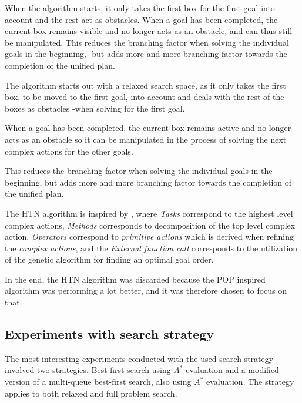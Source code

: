 \documentclass[Main]{subfiles}
\begin{document}
When the algorithm starts, it only takes the first box for the first goal into
account and the rest act as obstacles. When a goal has been completed, the
current box remains visible and no longer acts as an obstacle, and can thus
still be manipulated. This reduces the branching factor when solving the
individual goals in the beginning, -but adds more and more branching factor
towards the completion of the unified plan.

The algorithm starts out with a relaxed search space, as it only takes the first
box, to be moved to the first goal, into account and deals with the rest of the
boxes as obstacles -when solving for the first goal.

When a goal has been completed, the current box remains active and no longer
acts as an obstacle so it can be manipulated in the process of solving the next
complex actions for the other goals.

This reduces the branching factor when solving the individual goals in the
beginning, but adds more and more branching factor towards the completion of the
unified plan.

The HTN algorithm is inspired by \cite{nau2003shop2}, where \textit{Tasks}
correspond to the highest level complex actions, \textit{Methods} corresponds to
decomposition of the top level complex action, \textit{Operators} correspond to
\textit{primitive actions} which is derived when refining the \textit{complex
  actions}, and the \textit{External function call} corresponds to the
utilization of the genetic algorithm for finding an optimal goal order.

In the end, the HTN algorithm was discarded because the POP inspired algorithm was
performing a lot better, and it was therefore chosen to focus on that.

\subsection{Experiments with search strategy}
\label{sec:experiments_search_strategy}

The most interesting experiments conducted with the used search strategy
involved two strategies. Best-first search using $A^*$ evaluation and a modified
version of a multi-queue best-first search, also using $A^*$ evaluation. The
strategy applies to both relaxed and full problem search. 
\end{document}
